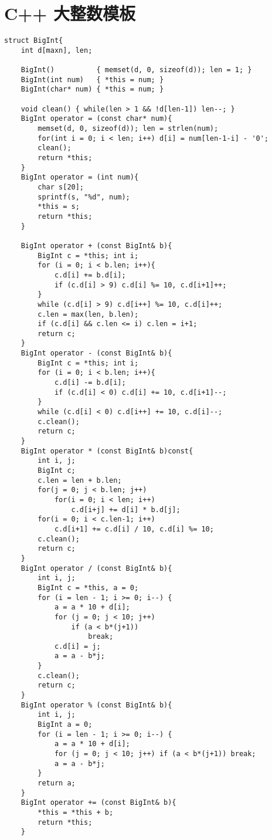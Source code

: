 \section{C++ 大整数模板}

\begin{verbatim}
struct BigInt{
    int d[maxn], len;
 
    BigInt()          { memset(d, 0, sizeof(d)); len = 1; }
    BigInt(int num)   { *this = num; } 
    BigInt(char* num) { *this = num; }

    void clean() { while(len > 1 && !d[len-1]) len--; }
    BigInt operator = (const char* num){
        memset(d, 0, sizeof(d)); len = strlen(num);
        for(int i = 0; i < len; i++) d[i] = num[len-1-i] - '0';
        clean();
        return *this;
    }
    BigInt operator = (int num){
        char s[20];
        sprintf(s, "%d", num);
        *this = s;
        return *this;
    }
 
    BigInt operator + (const BigInt& b){
        BigInt c = *this; int i;
        for (i = 0; i < b.len; i++){
            c.d[i] += b.d[i];
            if (c.d[i] > 9) c.d[i] %= 10, c.d[i+1]++;
        }
        while (c.d[i] > 9) c.d[i++] %= 10, c.d[i]++;
        c.len = max(len, b.len);
        if (c.d[i] && c.len <= i) c.len = i+1;
        return c;
    }
    BigInt operator - (const BigInt& b){
        BigInt c = *this; int i;
        for (i = 0; i < b.len; i++){
            c.d[i] -= b.d[i];
            if (c.d[i] < 0) c.d[i] += 10, c.d[i+1]--;
        }
        while (c.d[i] < 0) c.d[i++] += 10, c.d[i]--;
        c.clean();
        return c;
    }
    BigInt operator * (const BigInt& b)const{
        int i, j; 
        BigInt c;
        c.len = len + b.len; 
        for(j = 0; j < b.len; j++)
            for(i = 0; i < len; i++) 
                c.d[i+j] += d[i] * b.d[j];
        for(i = 0; i < c.len-1; i++)
            c.d[i+1] += c.d[i] / 10, c.d[i] %= 10;
        c.clean();
        return c;
    }
    BigInt operator / (const BigInt& b){
        int i, j;
        BigInt c = *this, a = 0;
        for (i = len - 1; i >= 0; i--) {
            a = a * 10 + d[i];
            for (j = 0; j < 10; j++)
                if (a < b*(j+1))
                    break;
            c.d[i] = j;
            a = a - b*j;
        }
        c.clean();
        return c;
    }
    BigInt operator % (const BigInt& b){
        int i, j;
        BigInt a = 0;
        for (i = len - 1; i >= 0; i--) {
            a = a * 10 + d[i];
            for (j = 0; j < 10; j++) if (a < b*(j+1)) break;
            a = a - b*j;
        }
        return a;
    }
    BigInt operator += (const BigInt& b){
        *this = *this + b;
        return *this;
    }
 

\end{verbatim}
